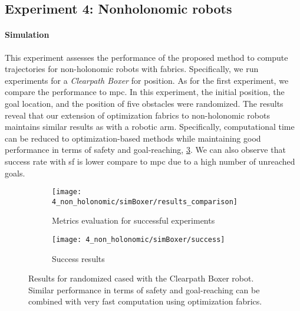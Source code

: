 \subsection{Experiment 4: Nonholonomic robots}%
\label{sub:experiment_4_nonholonomic_robots}

\paragraph{Simulation}
This experiment assesses the performance of the proposed method to compute
trajectories for non\hyp{}holonomic robots with fabrics. Specifically, we run
experiments for a \textit{Clearpath Boxer} for position. As
for the first experiment, we compare the performance to \ac{mpc}. In this
experiment, the initial position, the goal location, and the position of five
obstacles were randomized. The results reveal that our extension of
optimization fabrics to non\hyp{}holonomic robots maintains similar results as with
a robotic arm. Specifically, computational time can be reduced to
optimization-based methods while maintaining good performance in terms of
safety and goal-reaching, \cref{fig:experiment4_simBoxer}. We can also observe
that success rate with \ac{sf} is lower compare to \ac{mpc} due to a high
number of unreached goals.

\begin{figure}[ht]
  \centering
  \begin{subfigure}{1.0\linewidth}
    \centering
    \texttt{[image: 4\_non\_holonomic/simBoxer/results\_comparison]}
    \caption{Metrics evaluation for successful experiments}%
    \label{subfig:experiment4_simBoxer_res}
  \end{subfigure}
  \begin{subfigure}{1.0\linewidth}
    \centering
    \texttt{[image: 4\_non\_holonomic/simBoxer/success]}
    \caption{Success results}%
    \label{subfig:experiment4_simBoxer_success}
  \end{subfigure}
  \caption{Results for randomized cased with the Clearpath Boxer robot.
    Similar performance in terms of safety and goal-reaching can be combined with very
    fast computation using optimization fabrics.
  }%
  \label{fig:experiment4_simBoxer}
\end{figure}



